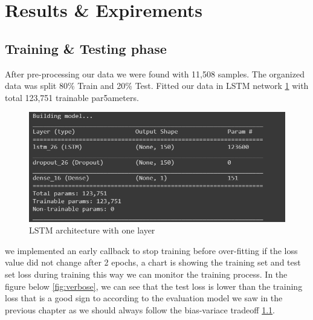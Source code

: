 \section{Results \& Expirements}

\subsection{Training \& Testing phase }
After pre-processing our data we were found with 11,508 samples. The organized data was split 80\% Train and 20\%  Test. Fitted  our data in  LSTM network \ref{fig:lstm-150} with total 123,751 trainable par5ameters.
%
\begin{figure}[H]
\centering
\includegraphics[width=.9\textwidth]{img/lstm_150.PNG}  
\caption{LSTM architecture with one layer}
\label{fig:lstm-150}
\end{figure}
%

we implemented an early callback to stop training before over-fitting if the loss value did not change after 2 epochs, a chart is showing the training set and test set loss during training this way we can monitor the training process.
In the figure below \ref{fig:verbose}, we can see that the test loss is lower than the training loss that is a good sign to  according to the evaluation model we saw in the previous chapter as we should always follow the bias-variace tradeoff \ref{}.

